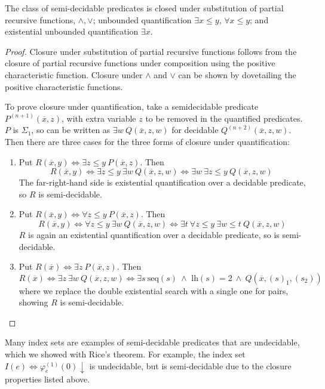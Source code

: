\begin{proposition}\label{semidecidable-closure}
The class of semi-decidable predicates is closed under substitution of partial recursive functions, $\land, \lor$; unbounded quantification $\exists x \leq y$, $\forall x \leq y$; and existential unbounded quantification $\exists x$.
\end{proposition}
\begin{proof}
Closure under substitution of partial recursive functions follows from the closure of partial recursive functions under composition using the positive characteristic function. Closure under $\land$ and $\lor$ can be shown by dovetailing the positive characteristic functions.

To prove closure under quantification, take a semidecidable predicate
$P^{(n+1)}(\overline{x}, z)$, with extra variable $z$ to be removed in the quantified predicates. $P$ is $\Sigma_1$, so can be written as $\exists w \ Q(\overline{x}, z, w)$ for decidable $Q^{(n+2)}(\overline{x}, z, w)$. Then there are three cases for the three forms of closure under quantification:
\begin{enumerate}
    \item Put $R(\overline{x}, y) \iff \exists z \leq y \ P(\overline{x}, z)$. Then \[
        R(\overline{x}, y) \iff \exists z \leq y \ \exists w \ Q(\overline{x}, z, w) \iff \exists w \ \exists z \leq y \ Q(\overline{x}, z, w)\
    \]
    The far-right-hand side is existential quantification over a decidable predicate, so $R$ is semi-decidable.
    \item Put $R(\overline{x}, y) \iff \forall z \leq y \ P(\overline{x}, z)$. Then \[
        R(\overline{x}, y) \iff \forall z \leq y \ \exists w \ Q(\overline{x}, z, w) \iff \exists t \ \forall z \leq y \ \exists w \leq t \ Q(\overline{x}, z, w)
    \]
    $R$ is again an existential quantification over a decidable predicate, so is semi-decidable.
    \item Put $R(\overline{x}) \iff \exists z \ P(\overline{x}, z)$. Then \[
        R(\overline{x}) \iff \exists z \ \exists w \ Q(\overline{x}, z, w) \iff \exists s \ \text{seq}(s)\  \land \text{ lh}(s) = 2 \ \land \ Q(\overline{x}, (s)_1, (s_2))
    \]
    where we replace the double existential search with a single one for pairs, showing $R$ is semi-decidable.
\end{enumerate}
\end{proof}

Many index sets are examples of semi-decidable predicates that are undecidable, which we showed with Rice's theorem. For example, the index set $I(e) \iff \varphi_e^{(1)}(0) \downarrow$ is undecidable, but is semi-decidable due to the closure properties listed above.


